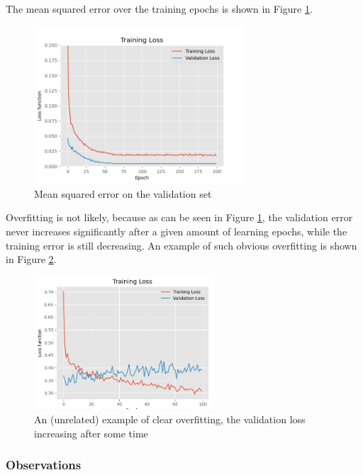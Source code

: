 The mean squared error over the training epochs is shown in Figure \ref{fig:nn-validation-error-curve}.

\begin{figure}[h]
    \centering
    \includegraphics[width=0.7\textwidth]{resources/images/mse-finalarch.png}
    \caption{Mean squared error on the validation set}
    \label{fig:nn-validation-error-curve}
\end{figure}

Overfitting is not likely, because as can be seen in Figure \ref{fig:nn-validation-error-curve}, the validation error never increases significantly after a given amount of learning epochs, while the training error is still decreasing. An example of such obvious overfitting is shown in Figure \ref{fig:overfitting}.

\begin{figure}[h]
    \centering
    \includegraphics[width=0.6\textwidth]{resources/images/overfitting.png}
    \caption{An (unrelated) example of clear overfitting, the validation loss increasing after some time}
    \label{fig:overfitting}
\end{figure}

\subsubsection{Observations}

